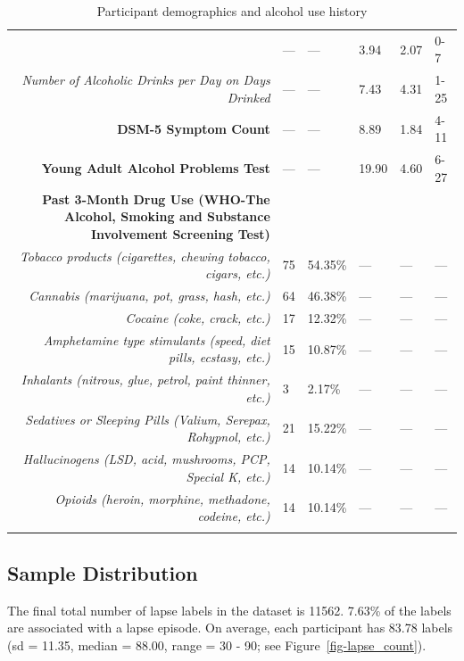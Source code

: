 \documentclass[
  letterpaper,
  DIV=11,
  numbers=noendperiod]{scrartcl}
\begin{document}
\begin{longtable}[]
{Day} & --- & --- & 3.94 & 2.07 & 0-7 \\
\emph{Number of Alcoholic Drinks per Day on Days Drinked} & --- & --- &
7.43 & 4.31 & 1-25 \\
\textbf{DSM-5 Symptom Count} & --- & --- & 8.89 & 1.84 & 4-11 \\
\textbf{Young Adult Alcohol Problems Test} & --- & --- & 19.90 & 4.60 &
6-27 \\
\textbf{Past 3-Month Drug Use (WHO-The Alcohol, Smoking and Substance
Involvement Screening Test)} & & & & & \\
\emph{Tobacco products (cigarettes, chewing tobacco, cigars, etc.)} & 75
& 54.35\% & --- & --- & --- \\
\emph{Cannabis (marijuana, pot, grass, hash, etc.)} & 64 & 46.38\% & ---
& --- & --- \\
\emph{Cocaine (coke, crack, etc.)} & 17 & 12.32\% & --- & --- & --- \\
\emph{Amphetamine type stimulants (speed, diet pills, ecstasy, etc.)} &
15 & 10.87\% & --- & --- & --- \\
\emph{Inhalants (nitrous, glue, petrol, paint thinner, etc.)} & 3 &
2.17\% & --- & --- & --- \\
\emph{Sedatives or Sleeping Pills (Valium, Serepax, Rohypnol, etc.)} &
21 & 15.22\% & --- & --- & --- \\
\emph{Hallucinogens (LSD, acid, mushrooms, PCP, Special K, etc.)} & 14 &
10.14\% & --- & --- & --- \\
\emph{Opioids (heroin, morphine, methadone, codeine, etc.)} & 14 &
10.14\% & --- & --- & --- \\
\caption{Participant demographics and alcohol use
history}\label{tbl-demographics}\tabularnewline
\end{longtable}

\subsection{Sample Distribution}\label{sample-distribution}

The final total number of lapse labels in the dataset is 11562. 7.63\%
of the labels are associated with a lapse episode. On average, each
participant has 83.78 labels (sd = 11.35, median = 88.00, range = 30 -
90; see Figure~\ref{fig-lapse_count}).
\end{document}
